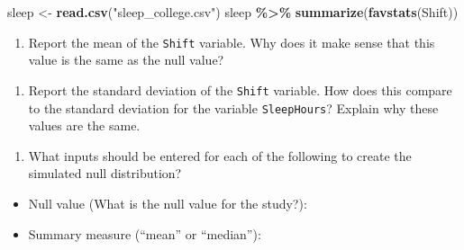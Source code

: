 \documentclass[
]{report}
\newenvironment{Shaded}{\begin{snugshade}}{\end{snugshade}}
\newcommand{\FunctionTok}[1]{\textcolor[rgb]{0.13,0.29,0.53}{\textbf{#1}}}
\newcommand{\NormalTok}[1]{#1}
\newcommand{\OtherTok}[1]{\textcolor[rgb]{0.56,0.35,0.01}{#1}}
\newcommand{\SpecialCharTok}[1]{\textcolor[rgb]{0.81,0.36,0.00}{\textbf{#1}}}
\newcommand{\StringTok}[1]{\textcolor[rgb]{0.31,0.60,0.02}{#1}}
\providecommand{\tightlist}{%
  \setlength{\itemsep}{0pt}\setlength{\parskip}{0pt}}
\begin{document}
\begin{Shaded}
\begin{Highlighting}[]
\NormalTok{sleep }\OtherTok{\textless{}{-}} \FunctionTok{read.csv}\NormalTok{(}\StringTok{"sleep\_college.csv"}\NormalTok{)}
\NormalTok{sleep }\SpecialCharTok{\%\textgreater{}\%}
    \FunctionTok{summarize}\NormalTok{(}\FunctionTok{favstats}\NormalTok{(Shift))}
\end{Highlighting}
\end{Shaded}

\begin{enumerate}
\def\labelenumi{\arabic{enumi}.}
\setcounter{enumi}{2}
\tightlist
\item
  Report the mean of the \texttt{Shift} variable. Why does it make sense that this value is the same as the null value?
\end{enumerate}

\vspace{0.9in}

\begin{enumerate}
\def\labelenumi{\arabic{enumi}.}
\setcounter{enumi}{3}
\tightlist
\item
  Report the standard deviation of the \texttt{Shift} variable. How does this compare to the standard deviation for the variable \texttt{SleepHours}? Explain why these values are the same.
\end{enumerate}

\vspace{0.9in}

\newpage

\begin{enumerate}
\def\labelenumi{\arabic{enumi}.}
\setcounter{enumi}{4}
\tightlist
\item
  What inputs should be entered for each of the following to create the simulated null distribution?
  \vspace{1mm}
\end{enumerate}

\begin{itemize}
\tightlist
\item
  Null value (What is the null value for the study?):
\end{itemize}

\vspace{.15in}

\begin{itemize}
\tightlist
\item
  Summary measure (``mean'' or ``median''):
\end{itemize}
\end{document}
